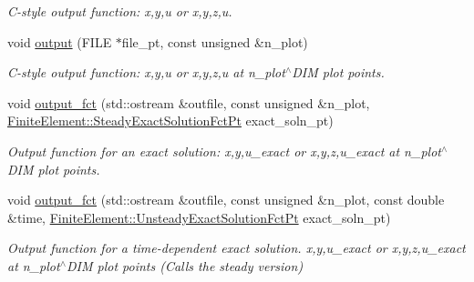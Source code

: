 \begin{DoxyCompactItemize}
\begin{DoxyCompactList}\small\item\em C-\/style output function\+: x,y,u or x,y,z,u. \end{DoxyCompactList}\item 
void \hyperlink{classoomph_1_1QUnsteadyHeatElement_af582182bc9c4df2fb77e4410b0579503}{output} (F\+I\+LE $\ast$file\+\_\+pt, const unsigned \&n\+\_\+plot)
\begin{DoxyCompactList}\small\item\em C-\/style output function\+: x,y,u or x,y,z,u at n\+\_\+plot$^\wedge$\+D\+IM plot points. \end{DoxyCompactList}\item 
void \hyperlink{classoomph_1_1QUnsteadyHeatElement_a4a9b9735828f0e11fd439944e2332781}{output\+\_\+fct} (std\+::ostream \&outfile, const unsigned \&n\+\_\+plot, \hyperlink{classoomph_1_1FiniteElement_a690fd33af26cc3e84f39bba6d5a85202}{Finite\+Element\+::\+Steady\+Exact\+Solution\+Fct\+Pt} exact\+\_\+soln\+\_\+pt)
\begin{DoxyCompactList}\small\item\em Output function for an exact solution\+: x,y,u\+\_\+exact or x,y,z,u\+\_\+exact at n\+\_\+plot$^\wedge$\+D\+IM plot points. \end{DoxyCompactList}\item 
void \hyperlink{classoomph_1_1QUnsteadyHeatElement_acf12936a99c1b43eb9459035e0c2648d}{output\+\_\+fct} (std\+::ostream \&outfile, const unsigned \&n\+\_\+plot, const double \&time, \hyperlink{classoomph_1_1FiniteElement_ad4ecf2b61b158a4b4d351a60d23c633e}{Finite\+Element\+::\+Unsteady\+Exact\+Solution\+Fct\+Pt} exact\+\_\+soln\+\_\+pt)
\begin{DoxyCompactList}\small\item\em Output function for a time-\/dependent exact solution. x,y,u\+\_\+exact or x,y,z,u\+\_\+exact at n\+\_\+plot$^\wedge$\+D\+IM plot points (Calls the steady version) \end{DoxyCompactList}\end{DoxyCompactItemize}
